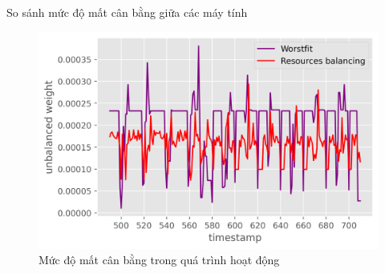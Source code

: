 \documentclass[11pt,xcolor={dvipsnames}, aspectratio=169]{beamer}
\begin{document}
\begin{frame}
{So sánh mức độ mất cân bằng giữa các máy tính}
\begin{figure}[h!]
	\centering
	\includegraphics[scale=0.6]{images/unbalanced_weights.png}
	\caption{Mức độ mất cân bằng trong quá trình hoạt động}
\end{figure}
\end{frame}

{\1
\begin{frame}
\end{frame}}
\end{document}
